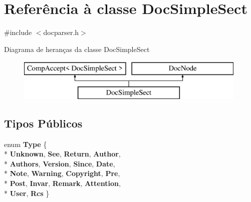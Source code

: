 \hypertarget{class_doc_simple_sect}{\section{Referência à classe Doc\-Simple\-Sect}
\label{class_doc_simple_sect}
}


{\ttfamily \#include $<$docparser.\-h$>$}

Diagrama de heranças da classe Doc\-Simple\-Sect\begin{figure}[H]
\begin{center}
\leavevmode
\includegraphics[height=2.000000cm]{class_doc_simple_sect}
\end{center}
\end{figure}
\subsection*{Tipos Públicos}
\begin{DoxyCompactItemize}
\item 
enum {\bfseries Type} \{ \\*
{\bfseries Unknown}, 
{\bfseries See}, 
{\bfseries Return}, 
{\bfseries Author}, 
\\*
{\bfseries Authors}, 
{\bfseries Version}, 
{\bfseries Since}, 
{\bfseries Date}, 
\\*
{\bfseries Note}, 
{\bfseries Warning}, 
{\bfseries Copyright}, 
{\bfseries Pre}, 
\\*
{\bfseries Post}, 
{\bfseries Invar}, 
{\bfseries Remark}, 
{\bfseries Attention}, 
\\*
{\bfseries User}, 
{\bfseries Rcs}
 \}
\end{DoxyCompactItemize}
